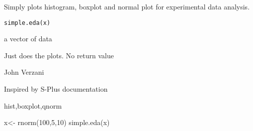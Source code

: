 \begin{Description}\relax
Simply plots histogram, boxplot and normal plot for experimental data
analysis.
\end{Description}
\begin{Usage}
\begin{verbatim}
simple.eda(x)
\end{verbatim}
\end{Usage}
\begin{Arguments}
\begin{ldescription}
\item[\code{x}] a vector of data 
\end{ldescription}
\end{Arguments}
\begin{Value}
Just does the plots. No return value
\end{Value}
\begin{Author}\relax
John Verzani
\end{Author}
\begin{References}\relax
Inspired by S-Plus documentation
\end{References}
\begin{SeeAlso}\relax
hist,boxplot,qnorm
\end{SeeAlso}
\begin{Examples}
\begin{ExampleCode}
  x<- rnorm(100,5,10)
  simple.eda(x)
\end{ExampleCode}
\end{Examples}

